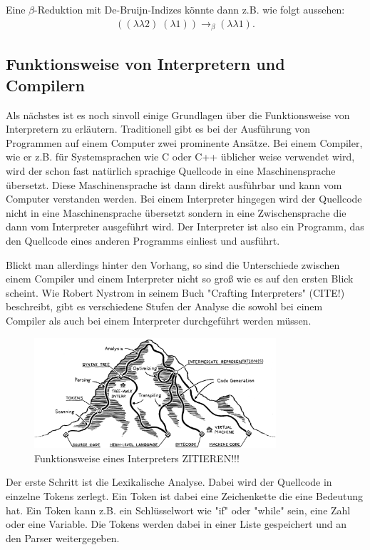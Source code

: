 \documentclass[ngerman]{article}
\begin{document}
Eine $\beta$-Reduktion mit De-Bruijn-Indizes könnte dann z.B. wie folgt aussehen:
\begin{align*}
    ((\lambda \lambda 2) \; (\lambda 1)) \rightarrow_\beta (\lambda\lambda 1).
\end{align*}

\subsection{Funktionsweise von Interpretern und Compilern}

Als nächstes ist es noch sinvoll einige Grundlagen über die Funktionsweise von Interpretern zu erläutern. 
Traditionell gibt es bei der Ausführung von Programmen auf einem Computer zwei prominente Ansätze. Bei einem Compiler, wie er z.B. für Systemsprachen wie C oder C++ üblicher weise verwendet wird, wird der schon fast natürlich sprachige Quellcode in eine Maschinensprache übersetzt. Diese Maschinensprache ist dann direkt ausführbar und kann vom Computer verstanden werden. Bei einem Interpreter hingegen wird der Quellcode nicht in eine Maschinensprache übersetzt sondern in eine Zwischensprache die dann vom Interpreter ausgeführt wird. Der Interpreter ist also ein Programm, das den Quellcode eines anderen Programms einliest und ausführt.

Blickt man allerdings hinter den Vorhang, so sind die Unterschiede zwischen einem Compiler und einem Interpreter nicht so groß wie es auf den ersten Blick scheint. Wie Robert Nystrom in seinem Buch "Crafting Interpreters" (CITE!) beschreibt, gibt es verschiedene Stufen der Analyse die sowohl bei einem Compiler als auch bei einem Interpreter durchgeführt werden müssen.

\begin{figure}
    \centering
    \includegraphics[width=0.8\textwidth]{mountain.png}
    \caption{Funktionsweise eines Interpreters ZITIEREN!!!}
    \label{fig:interpreter}
\end{figure}

Der erste Schritt ist die Lexikalische Analyse. Dabei wird der Quellcode in einzelne Tokens zerlegt. Ein Token ist dabei eine Zeichenkette die eine Bedeutung hat. Ein Token kann z.B. ein Schlüsselwort wie "if" oder "while" sein, eine Zahl oder eine Variable. Die Tokens werden dabei in einer Liste gespeichert und an den Parser weitergegeben.
\end{document}
